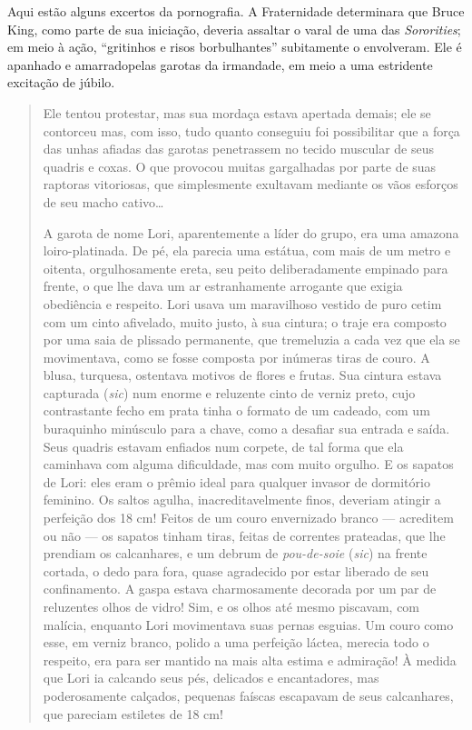 Aqui estão alguns excertos da pornografia. A Fraternidade
determinara que Bruce King, como parte de sua iniciação, deveria
assaltar o varal de uma das \textit{Sororities}; em meio à ação,
``gritinhos e risos borbulhantes'' subitamente o envolveram.
Ele é apanhado e amarrado\idxamarr[|(] pelas garotas da
irmandade, em meio a uma estridente excitação de júbilo.

\begin{quote}

Ele tentou protestar, mas sua mordaça estava apertada
demais; ele se contorceu mas, com isso, tudo quanto conseguiu foi
possibilitar que a força das unhas afiadas das garotas penetrassem no
tecido muscular de seus quadris e coxas. O que provocou muitas
gargalhadas por parte de suas raptoras vitoriosas, que simplesmente
exultavam mediante os vãos esforços de seu macho cativo\ldots{}

A garota de nome Lori, aparentemente a líder do grupo, era uma
amazona loiro-platinada. De pé, ela parecia uma estátua, com mais de um
metro e oitenta, orgulhosamente ereta, seu peito deliberadamente
empinado para frente, o que lhe dava um ar estranhamente arrogante
que exigia obediência e respeito. Lori usava um maravilhoso vestido de
puro cetim com um cinto afivelado, muito justo, à sua cintura; o traje
era composto por uma saia de plissado permanente, que tremeluzia a cada
vez que ela se movimentava, como se fosse composta por inúmeras tiras
de couro. A blusa, turquesa, ostentava motivos de flores e frutas. Sua
cintura estava capturada (\textit{sic}) num enorme e reluzente cinto de
verniz preto, cujo contrastante fecho em prata tinha o formato de um
cadeado, com um buraquinho minúsculo para a chave, como a desafiar sua
entrada e saída. Seus quadris estavam enfiados num corpete, de tal
forma que ela caminhava com alguma dificuldade, mas com muito orgulho.
E os sapatos de Lori: eles eram o prêmio ideal para qualquer invasor de
dormitório feminino. Os saltos agulha, inacreditavelmente finos,
deveriam atingir a perfeição dos 18 cm! Feitos de um couro envernizado
branco --- acreditem ou não --- os sapatos tinham tiras, feitas de
correntes prateadas, que lhe prendiam os calcanhares, e um debrum de
\textit{pou-de-soie} (\textit{sic}) na frente cortada, o dedo para
fora, quase agradecido por estar liberado de seu confinamento. A gaspa
estava charmosamente decorada por um par de reluzentes olhos de vidro!
Sim, e os olhos até mesmo piscavam, com malícia, enquanto Lori
movimentava suas pernas esguias. Um couro como esse, em verniz branco,
polido a uma perfeição láctea, merecia todo o respeito, era para ser
mantido na mais alta estima e admiração! À medida que Lori ia calcando seus
pés, delicados e encantadores, mas poderosamente calçados, pequenas
faíscas escapavam de seus calcanhares, que pareciam estiletes de 18 cm!


\end{quote}
